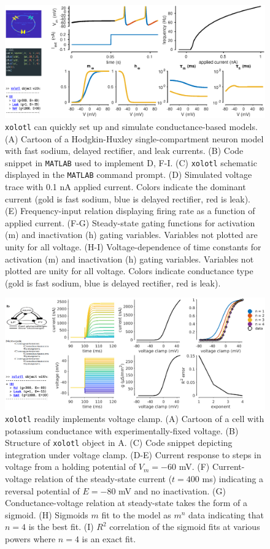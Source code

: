 \documentclass{frontiersSCNS} %
\begin{document}
\begin{figure}
	\centering
	\includegraphics[width=1.0\linewidth]{gfx/figure_HH}
	\caption{\texttt{xolotl} can quickly set up and simulate conductance-based models. (A) Cartoon of a Hodgkin-Huxley single-compartment neuron model with fast sodium, delayed rectifier, and leak currents. (B) Code snippet in \texttt{MATLAB} used to implement D, F-I. (C) \texttt{xolotl} schematic displayed in the \texttt{MATLAB} command prompt. (D) Simulated voltage trace with 0.1 nA applied current. Colors indicate the dominant current (gold is fast sodium, blue is delayed rectifier, red is leak). (E) Frequency-input relation displaying firing rate as a function of applied current. (F-G) Steady-state gating functions for activation (m) and inactivation (h) gating variables. Variables not plotted are unity for all voltage. (H-I) Voltage-dependence of time constants for activation (m) and inactivation (h) gating variables. Variables not plotted are unity for all voltage. Colors indicate conductance type (gold is fast sodium, blue is delayed rectifier, red is leak).}
	\label{fig:figurehh}
\end{figure}

\begin{figure}
	\centering
	\includegraphics[width=1.0\linewidth]{gfx/figure_clamp}
	\caption{\texttt{xolotl} readily implements voltage clamp. (A) Cartoon of a cell with potassium conductance with experimentally-fixed voltage. (B) Structure of \texttt{xolotl} object in A. (C) Code snippet depicting integration under voltage clamp. (D-E) Current response to steps in voltage from a holding potential of $V_m = -60$ mV. (F) Current-voltage relation of the steady-state current ($t = 400$ ms) indicating a reversal potential of $E = -80$ mV and no inactivation. (G) Conductance-voltage relation at steady-state takes the form of a sigmoid. (H) Sigmoids $m$ fit to the model as $m^n$ data indicating that $n=4$ is the best fit. (I) $R^2$ correlation of the sigmoid fits at various powers where $n=4$ is an exact fit.}
	\label{fig:figureclamp}
\end{figure}
\end{document}
